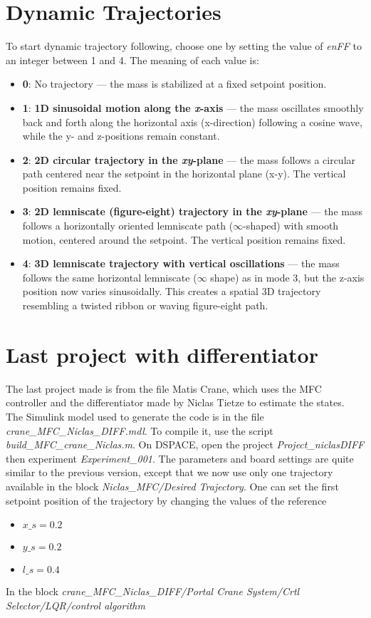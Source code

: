 \section*{Dynamic Trajectories}
To start dynamic trajectory following, choose one by setting the value of \textit{enFF} to an integer between 1 and 4. The meaning of each value is:
\begin{itemize}
    \item \textbf{0}: No trajectory — the mass is stabilized at a fixed setpoint position.
    
    \item \textbf{1}: \textbf{1D sinusoidal motion along the \textit{x}-axis} — the mass oscillates smoothly back and forth along the horizontal axis (x-direction) following a cosine wave, while the y- and z-positions remain constant.
    \item \textbf{2}: \textbf{2D circular trajectory in the \textit{xy}-plane} — the mass follows a circular path centered near the setpoint in the horizontal plane (x-y). The vertical position remains fixed.
    \item \textbf{3}: \textbf{2D lemniscate (figure-eight) trajectory in the \textit{xy}-plane} — the mass follows a horizontally oriented lemniscate path (\(\infty\)-shaped) with smooth motion, centered around the setpoint. The vertical position remains fixed.
    \item \textbf{4}: \textbf{3D lemniscate trajectory with vertical oscillations} — the mass follows the same horizontal lemniscate (\(\infty\) shape) as in mode 3, but the z-axis position now varies sinusoidally. This creates a spatial 3D trajectory resembling a twisted ribbon or waving figure-eight path.
\end{itemize}
\section*{Last project with differentiator}
The last project made is from the file Matis Crane, which uses the MFC controller and the differentiator made by Niclas Tietze to estimate the states.
The Simulink model used to generate the code is in the file \textit{crane\_MFC\_Niclas\_DIFF.mdl}. To compile it, use the script \textit{build\_MFC\_crane\_Niclas.m}.
On DSPACE, open the project \textit{Project\_niclasDIFF} then experiment \textit{Experiment\_001}.
The parameters and board settings are quite similar to the previous version, except that we now use only one trajectory available in the block \textit{Niclas\_MFC/Desired Trajectory}.
One can set the first setpoint position of the trajectory by changing the values of the reference
\begin{itemize}
    \item \(x\_s = 0.2\)
    \item \(y\_s = 0.2\)
    \item \(l\_s = 0.4\)
\end{itemize}
{\sloppy In the block \textit{crane\_MFC\_Niclas\_DIFF/Portal Crane System/Crtl Selector/LQR/control algorithm}}

